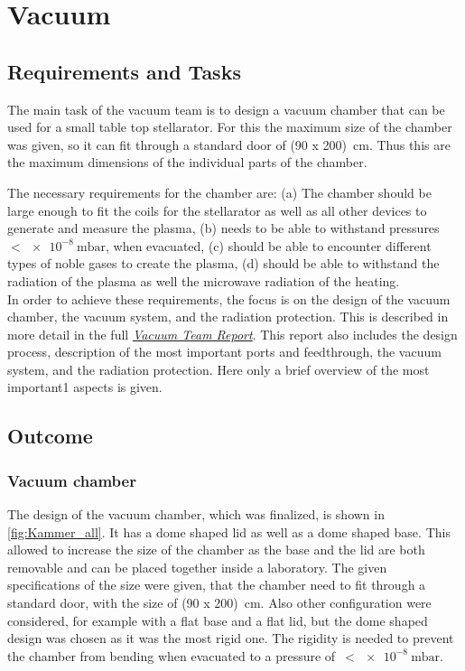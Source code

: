 \section{Vacuum}
\subsection{Requirements and Tasks}

The main task of the vacuum team is to design a vacuum chamber that can be used for a small table top stellarator.
For this the maximum size of the chamber was given, so it can fit through a standard door of (90 x 200)~cm.
Thus this are the maximum dimensions of the individual parts of the chamber.

The necessary requirements for the chamber are:
(a) The chamber should be large enough to fit the coils for the stellarator as well as all other devices to generate and measure the plasma,
(b) needs to be able to withstand pressures $<\SI{e-8}{\milli\bar}$, when evacuated,
(c) should be able to encounter different types of noble gases to create the plasma,
(d) should be able to withstand the radiation of the plasma as well the microwave radiation of the heating. \\

In order to achieve these requirements, the focus is on the design of the vacuum chamber, the vacuum system, and the radiation protection.
This is described in more detail in the full \href{https://www.overleaf.com/3861427278qpnrdmbhknty#518852}{\emph{Vacuum Team Report}}.
This report also includes the design process, description of the most important ports and feedthrough, the vacuum system, and the radiation protection.
Here only a brief overview of the most important1 aspects is given.

\subsection{Outcome}

\subsubsection{Vacuum chamber}

The design of the vacuum chamber, which was finalized, is shown in \autoref{fig:Kammer_all}.
It has a dome shaped lid as well as a dome shaped base.
This allowed to increase the size of the chamber as the base and the lid are both removable and can be placed together inside a laboratory.
The given specifications of the size were given, that the chamber need to fit through a standard door, with the size of (90 x 200)~cm.
Also other configuration were considered, for example with a flat base and a flat lid, but the dome shaped design was chosen as it was the most rigid one.
The rigidity is needed to prevent the chamber from bending when evacuated to a pressure of~$<\SI{e-8}{\milli\bar}$.

